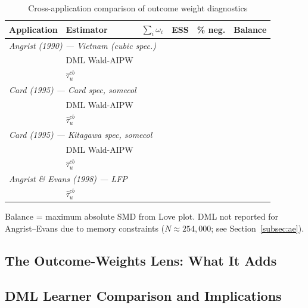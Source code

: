\documentclass[12pt, a4paper, oneside]{article}
\theoremstyle{plain}
\theoremstyle{definition}
\begin{document}
\begin{table}[H]
  \centering
  \caption{Cross-application comparison of outcome weight diagnostics}
  \label{tab:cross_app}
  \begin{threeparttable}
    \begin{tabular}{llrrrr}
      \toprule
      Application & Estimator & $\sum_i\omega_i$ & ESS & \% neg. & Balance \\
      \midrule
      \multicolumn{6}{l}{\textit{Angrist (1990) — Vietnam (cubic spec.)}} \\
      & DML Wald-AIPW & & & & \\
      & $\hat\tau_u^{cb}$ & & & & \\[4pt]
      \multicolumn{6}{l}{\textit{Card (1995) — Card spec, somecol}} \\
      & DML Wald-AIPW & & & & \\
      & $\hat\tau_u^{cb}$ & & & & \\[4pt]
      \multicolumn{6}{l}{\textit{Card (1995) — Kitagawa spec, somecol}} \\
      & DML Wald-AIPW & & & & \\
      & $\hat\tau_u^{cb}$ & & & & \\[4pt]
      \multicolumn{6}{l}{\textit{Angrist \& Evans (1998) — LFP}} \\
      & $\hat\tau_u^{cb}$ & & & & \\
      \bottomrule
    \end{tabular}
    \begin{tablenotes}
      \small\item Balance = maximum absolute SMD from Love plot.
      DML not reported for Angrist--Evans due to memory constraints
      ($N \approx 254{,}000$; see Section~\ref{subsec:ae}).
    \end{tablenotes}
  \end{threeparttable}
\end{table}

\subsection{The Outcome-Weights Lens: What It Adds}
\label{subsec:lens}


\subsection{DML Learner Comparison and Implications}
\label{subsec:dml_learners}
\end{document}
